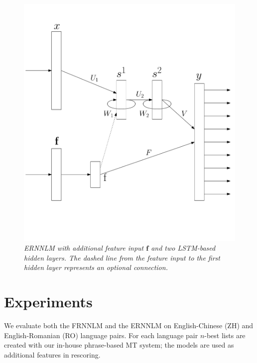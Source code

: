 \documentclass[a4paper]{article}
\begin{document}
\begin{figure} 
\centering 
\includegraphics[width=\columnwidth]{ModelExtended2.pdf}
\caption{\it ERNNLM with additional feature input $\textbf{f}$ and two LSTM-based hidden layers. The dashed line from the feature input to the first hidden layer represents an optional connection.}
\label{fig:model-extended}
\end{figure}


\section{Experiments}
We evaluate both the FRNNLM and the ERNNLM on English-Chinese (ZH) and English-Romanian (RO) language pairs. For each language pair $n$-best lists are created with our in-house phrase-based MT system; the models are used as additional features in rescoring.
\end{document}
